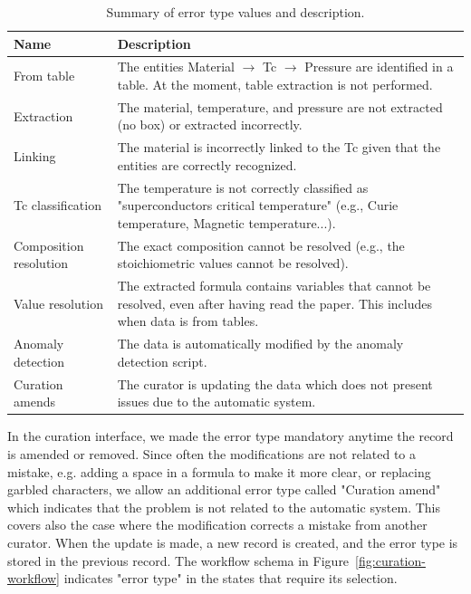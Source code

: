 \documentclass[a4paper]{article}
\begin{document}
\begin{table}[htbp]
\centering
\caption{Summary of error type values and description.}
\begin{tabular}{lp{8cm}}
\toprule
\textbf{Name} & \textbf{Description} \\
\midrule
From table & The entities Material $\rightarrow$ Tc $\rightarrow$ Pressure are identified in a table. At the moment, table extraction is not performed. \\
Extraction & The material, temperature, and pressure are not extracted (no box) or extracted incorrectly. \\
Linking & The material is incorrectly linked to the Tc given that the entities are correctly recognized. \\
Tc classification & The temperature is not correctly classified as "superconductors critical temperature" (e.g., Curie temperature, Magnetic temperature...). \\
Composition resolution & The exact composition cannot be resolved (e.g., the stoichiometric values cannot be resolved). \\
Value resolution & The extracted formula contains variables that cannot be resolved, even after having read the paper. This includes when data is from tables. \\
Anomaly detection & The data is automatically modified by the anomaly detection script. \\
Curation amends & The curator is updating the data which does not present issues due to the automatic system. \\
\bottomrule
\end{tabular}
\label{tab:error-types}
\end{table}

In the curation interface, we made the error type mandatory anytime the record is amended or removed. 
Since often the modifications are not related to a mistake, e.g. adding a space in a formula to make it more clear, or replacing garbled characters, we allow an additional error type called "Curation amend" which indicates that the problem is not related to the automatic system. This covers also the case where the modification corrects a mistake from another curator. 
When the update is made, a new record is created, and the error type is stored in the previous record. The workflow schema in Figure~\ref{fig:curation-workflow} indicates "error type" in the states that require its selection. 
\end{document}
